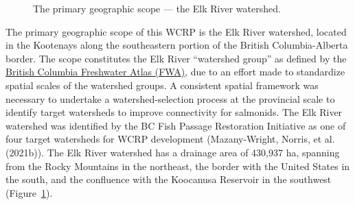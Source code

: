 \documentclass[
  letterpaper,
  DIV=11,
  numbers=noendperiod]{scrreprt}
\begin{document}
\begin{figure}


\caption{\label{fig-geoscope}The primary geographic scope --- the Elk
River watershed.}

\end{figure}%

The primary geographic scope of this WCRP is the Elk River watershed,
located in the Kootenays along the southeastern portion of the British
Columbia-Alberta border. The scope constitutes the Elk River ``watershed
group'' as defined by the
\href{https://catalogue.data.gov.bc.ca/dataset/freshwater-atlas-watershed-groups}{British
Columbia Freshwater Atlas (FWA)}, due to an effort made to standardize
spatial scales of the watershed groups. A consistent spatial framework
was necessary to undertake a watershed-selection process at the
provincial scale to identify target watersheds to improve connectivity
for salmonids. The Elk River watershed was identified by the BC Fish
Passage Restoration Initiative as one of four target watersheds for WCRP
development (Mazany-Wright, Norris, et al. (2021b)). The Elk River
watershed has a drainage area of 430,937 ha, spanning from the Rocky
Mountains in the northeast, the border with the United States in the
south, and the confluence with the Koocanusa Reservoir in the southwest
(Figure~\ref{fig-geoscope}).
\end{document}
